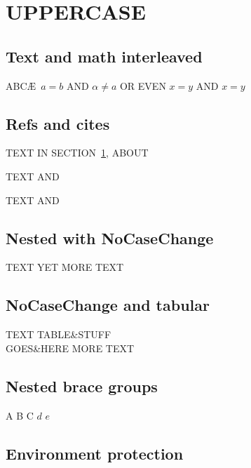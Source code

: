 \documentclass{article}
\begin{document}
\section{\MakeTextUppercase{Uppercase}}\label{intro}

\subsection{Text and math interleaved}

\MakeTextUppercase{abc\ae\ \( a = b \) and $\alpha \neq a$
or even \ensuremath{x=y} and $\ensuremath{x=y}$}

\subsection{Refs and cites}

\MakeTextUppercase{%
Text in section~\ref{intro}, about \cite[pp 2--4]{bbb}}

\MakeTextUppercase{%
Text \cite{bbb} and \cite{ccc}}

{\renewcommand\citeform{\MakeUppercase}\MakeTextUppercase{%
Text \cite{bbb} and \cite{ccc}}}

\subsection{Nested with NoCaseChange}

\MakeTextUppercase{%
Text  yet more text}

\subsection{NoCaseChange and tabular}

\MakeTextUppercase{%
Text %
table&stuff\\goes&here
\NoCaseChange{\end{tabular}}
More text}

\subsection{Nested brace groups}

\MakeTextUppercase{a b {c $d$} $e$}

\subsection{Environment protection}
\end{document}
